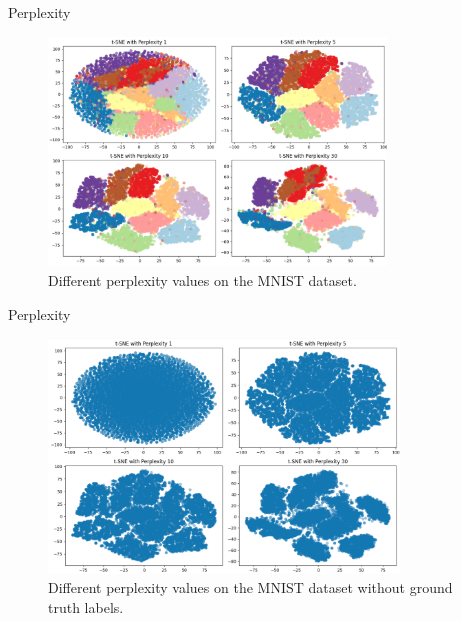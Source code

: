 \begin{frame}{Perplexity}
    \begin{figure}
        \centering
        \includegraphics[width=0.8\textwidth]{varying_perplexity.png}
        \caption{Different perplexity values on the MNIST dataset.}
    \end{figure} 
\end{frame}

\begin{frame}{Perplexity}
    \begin{figure}
        \centering
        \includegraphics[width=0.83\textwidth]{perplexity_without_gt.png}
        \caption{Different perplexity values on the MNIST dataset without ground truth labels.}
    \end{figure} 
\end{frame}

